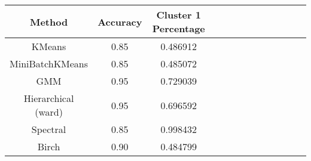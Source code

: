 \begin{tabular}{ccccccccccccc}
\toprule
             Method &  Accuracy &  Cluster 1 Percentage \\
\midrule
             KMeans &      0.85 &              0.486912 \\
    MiniBatchKMeans &      0.85 &              0.485072 \\
                GMM &      0.95 &              0.729039 \\
Hierarchical (ward) &      0.95 &              0.696592 \\
           Spectral &      0.85 &              0.998432 \\
              Birch &      0.90 &              0.484799 \\
\bottomrule
\end{tabular}
